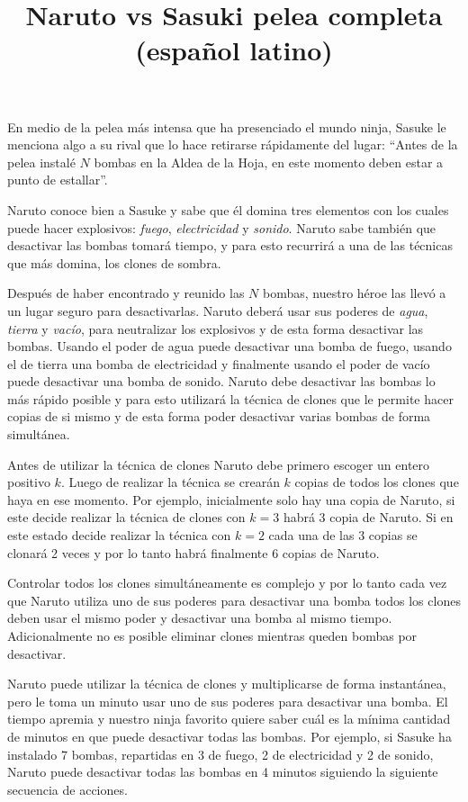 \documentclass{oci}
\title{Naruto vs Sasuki pelea completa (español latino)}
\begin{document}
\begin{problemDescription}
En medio de la pelea más intensa que ha presenciado el mundo ninja, Sasuke le
menciona algo a su rival que lo hace retirarse rápidamente del lugar: ``Antes de
la pelea instalé $N$ bombas en la Aldea de la Hoja, en este momento deben estar
a punto de estallar''.

Naruto conoce bien a Sasuke y sabe que él domina tres elementos con los cuales
puede hacer explosivos: \emph{fuego}, \emph{electricidad} y \emph{sonido}.
Naruto sabe también que desactivar las bombas tomará tiempo, y para esto
recurrirá a una de las técnicas que más domina, los clones de sombra.

Después de haber encontrado y reunido las $N$ bombas, nuestro héroe las llevó a
un lugar seguro para desactivarlas.
Naruto deberá usar sus poderes de \emph{agua}, \emph{tierra} y \emph{vacío},
para neutralizar los explosivos y de esta forma desactivar las bombas.
Usando el poder de agua puede desactivar una bomba de fuego, usando el de
tierra una bomba de electricidad y finalmente usando el poder de vacío puede
desactivar una bomba de sonido.
Naruto debe desactivar las bombas lo más rápido posible y para esto utilizará la
técnica de clones que le permite hacer copias de si mismo y de esta forma poder 
desactivar varias bombas de forma simultánea.

Antes de utilizar la técnica de clones Naruto debe primero escoger un entero
positivo $k$.
Luego de realizar la técnica se crearán $k$ copias de todos los clones que
haya en ese momento.
Por ejemplo, inicialmente solo hay una copia de Naruto, si este decide realizar
la técnica de clones con $k=3$ habrá 3 copia de Naruto.
Si en este estado decide realizar la técnica con $k=2$ cada una de las 3 copias
se clonará 2 veces y por lo tanto habrá finalmente 6 copias de Naruto.

Controlar todos los clones simultáneamente es complejo y por lo tanto cada vez
que Naruto utiliza uno de sus poderes para desactivar una bomba todos los clones
deben usar el mismo poder y desactivar una bomba al mismo tiempo.
Adicionalmente no es posible eliminar clones mientras queden bombas por
desactivar.

Naruto puede utilizar la técnica de clones y multiplicarse de forma instantánea,
pero le toma un minuto usar uno de sus poderes para desactivar una bomba.
El tiempo apremia y nuestro ninja favorito quiere saber cuál es la mínima
cantidad de minutos en que puede desactivar todas las bombas.
Por ejemplo, si Sasuke ha instalado 7 bombas, repartidas en 3 de fuego, 2 de
electricidad y 2 de sonido, Naruto puede desactivar todas las bombas en 4
minutos siguiendo la siguiente secuencia de acciones.


\end{problemDescription}
\end{document}
